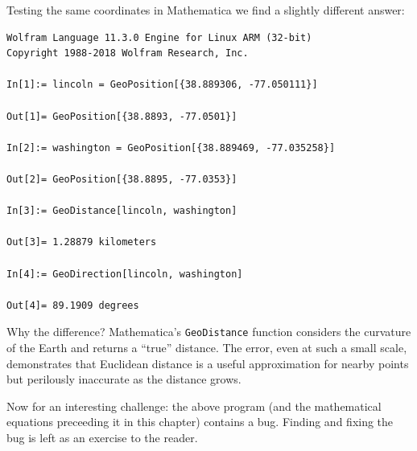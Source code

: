 \documentclass{book}
\begin{document}
Testing the same coordinates in Mathematica we find a slightly different answer:

\begin{lstlisting}
Wolfram Language 11.3.0 Engine for Linux ARM (32-bit)
Copyright 1988-2018 Wolfram Research, Inc.

In[1]:= lincoln = GeoPosition[{38.889306, -77.050111}]

Out[1]= GeoPosition[{38.8893, -77.0501}]

In[2]:= washington = GeoPosition[{38.889469, -77.035258}]

Out[2]= GeoPosition[{38.8895, -77.0353}]

In[3]:= GeoDistance[lincoln, washington]

Out[3]= 1.28879 kilometers

In[4]:= GeoDirection[lincoln, washington]

Out[4]= 89.1909 degrees
\end{lstlisting}

Why the difference? Mathematica's \texttt{GeoDistance} function considers the curvature of the Earth and returns a ``true'' distance. The error, even at such a small scale, demonstrates that Euclidean distance is a useful approximation for nearby points but perilously inaccurate as the distance grows.

Now for an interesting challenge: the above program (and the mathematical equations preceeding it in this chapter) contains a bug. Finding and fixing the bug is left as an exercise to the reader.



\end{document}
